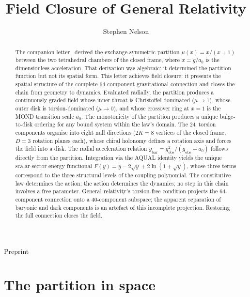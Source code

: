 \documentclass[twocolumn]{iopjournal}
\renewcommand{\articletype}[1]{%
  {\vspace*{-8mm}\noindent \Large \sf Preprint}\par
  \vspace*{6mm}\noindent{\scriptsize \sf{\bfseries \MakeUppercase{#1}}}}
\begin{document}
\articletype{Letter}

\title{Field Closure of General Relativity}

\author{Stephen Nelson}



\begin{abstract}
The companion letter~\cite{Nelson2026b} derived the
exchange-symmetric partition $\mu(x) = x/(x{+}1)$ between the
two tetrahedral chambers of the closed frame, where
$x = g/a_0$ is the dimensionless acceleration.  That derivation
was algebraic: it determined the partition function but not its
spatial form.  This letter achieves field closure: it
presents the spatial structure of the complete 64-component
gravitational connection and closes the chain from geometry to
dynamics.
Evaluated radially, the partition produces
a continuously graded field whose inner throat is
Christoffel-dominated ($\mu \to 1$), whose outer disk is
torsion-dominated ($\mu \to 0$), and whose crossover ring at
$x = 1$ is the MOND transition scale $a_0$.  The monotonicity
of the partition produces a unique bulge-to-disk ordering for
any bound system within the law's domain.  The
24~torsion components organise into eight null directions
($2K = 8$ vertices of the closed frame, $D = 3$ rotation
planes each), whose chiral holonomy defines a rotation axis
and forces the field into a disk.  The radial acceleration relation
$g_{\mathrm{bar}} = g_{\mathrm{obs}}^2/(g_{\mathrm{obs}} +
a_0)$ follows directly from the partition.  Integration via the
AQUAL identity yields the unique scalar-sector energy
functional $F(y) = y - 2\sqrt{y} + 2\ln(1{+}\sqrt{y})$,
whose three terms correspond to the three structural levels of
the coupling polynomial.  The constitutive law determines the
action; the action determines the dynamics; no step in this
chain involves a free parameter.  General relativity's
torsion-free condition projects the 64-component connection
onto a 40-component subspace; the apparent separation of
baryonic and dark components is an artefact of this
incomplete projection.  Restoring the full connection closes
the field.
\end{abstract}


\section{The partition in space}
\end{document}
